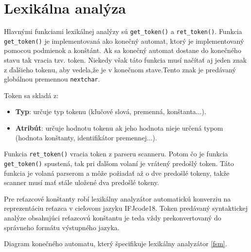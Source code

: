\documentclass[a4paper, 11pt]{article}
\begin{document}
\section{Lexikálna analýza}
Hlavnými funkciami lexikálnej analýzy sú \texttt{get\_token()} a \texttt{ret\_token()}. Funkcia \texttt{get\_token()} je implementovaná ako konečný automat, ktorý je implementovaný pomocou podmienok a konštánt. Ak sa konečný automat dostane do konečného stavu tak vracia tzv. token. Niekedy však táto funkcia musí načítať aj jeden znak z ďalšieho tokenu, aby vedela,že je v konečnom stave.Tento znak je predávaný globálnou premennou \texttt{nextchar}. 

Token sa skladá z:
\begin{itemize}
	\item \textbf{Typ}: určuje typ tokenu (kľučové slová, premenná, konštanta...).
	\item \textbf{Atribút}: určuje hodnotu tokenu ak jeho hodnota nieje určená typom (hodnota konštanty, identifikátor premennej...).
\end{itemize}

Funkcia \texttt{ret\_token()} vracia token z parseru scanneru. Potom čo je funkcia \texttt{get\_token()} spustená, tak pri ďalšom volaní je vrátený predošlý token. Táto funkcia je volaná parserom a môže požiadať až o dve predošlé tokeny, takže scanner musí mať stále uložené dva predošlé tokeny.

Pre reťazcové konštanty robí lexikálny analyzátor automatickú konverziu na reprezentáciu reťazca v cieľovom jazyku IFJcode18. Token predávaný syntaktickej analýze obsahujúci reťazcovú konštantu je teda vždy prekonvertovaný do správneho formátu výstupného jazyka.

Diagram konečného automatu, který špecifikuje lexikálny analyzátor \ref{fsm}.
\end{document}
